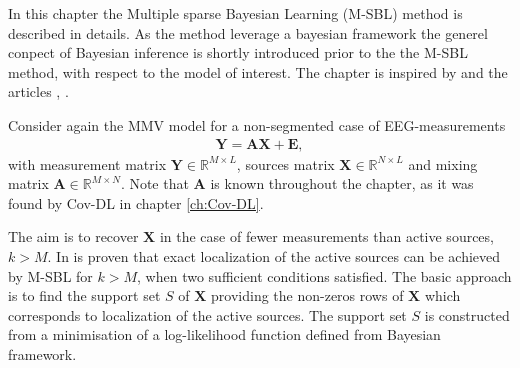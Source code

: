 In this chapter the Multiple sparse Bayesian Learning (M-SBL) method is described in details. As the method leverage a bayesian framework the generel conpect of Bayesian inference is shortly introduced prior to the the M-SBL method, with respect to the model of interest. The chapter is inspired by \cite{phd_wipf} and the articles \cite{article_wipf}, \cite{Balkan2014}.

Consider again the MMV model for a non-segmented case of EEG-measurements
\begin{align*}
\mathbf{Y} = \mathbf{AX} + \mathbf{E},
\end{align*}
with measurement matrix $\mathbf{Y} \in \mathbb{R}^{M \times L}$, sources matrix $\mathbf{X} \in \mathbb{R}^{N \times L}$ and mixing matrix $\mathbf{A} \in \mathbb{R}^{M \times N}$. Note that $\textbf{A}$ is known throughout the chapter, as it was found by Cov-DL in chapter \ref{ch:Cov-DL}.

The aim is to recover $\textbf{X}$ in the case of fewer measurements than active sources, $k>M$. In \cite{Balkan2014} is proven that exact localization of the active sources can be achieved by M-SBL for $k>M$, when two sufficient conditions satisfied.   
The basic approach is to find the support set $S$ of $\textbf{X}$ providing the non-zeros rows of $\mathbf{X}$ which corresponds to localization of the active sources. The support set $S$ is constructed from a minimisation of a log-likelihood function defined from Bayesian framework.

